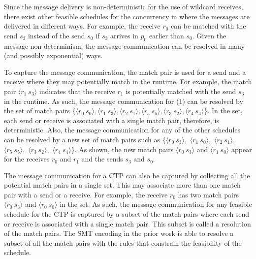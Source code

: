 Since the message delivery is non-deterministic for the use of wildcard receives, there exist other feasible schedules for the concurrency in  where the messages are delivered in different ways. For example,  the receive $r_0$ can be matched with the send $s_3$ instead of the send $s_0$ if $s_3$ arrives in $p_0$ earlier than $s_0$. Given the message non-determinism, the message communication can be resolved in many (and possibly exponential) ways. 

To capture the message communication, the match pair is used for a send and a receive where they may potentially match in the runtime.
For example, the match pair $\langle r_1\ s_3\rangle$ indicates that the receive $r_1$ is potentially matched with the send $s_3$ in the runtime.
As such, the message communication for (1) can be resolved by the set of match pairs $\{\langle r_0\ s_0\rangle, \langle r_1\ s_3\rangle, \langle r_2\ s_1\rangle, \langle r_5\ s_5\rangle, \langle r_3\ s_2\rangle, \langle r_4\ s_4\rangle\}$. In the set, each send or receive is associated with a single match pair, therefore, is deterministic. Also, the message communication for any of the other schedules can be resolved by a new set of match pairs such as $\{\langle r_0\ s_3\rangle,$ $\langle r_1\ s_0\rangle,$ $\langle r_2\ s_1\rangle,$ $\langle r_5\ s_5\rangle,$ $\langle r_3\ s_2\rangle,$ $\langle r_4\ s_4\rangle\}$. As shown, the new match pairs $\langle r_0\ s_3\rangle$ and $\langle r_1\ s_0\rangle$ appear for the receives $r_0$ and $r_1$ and the sends $s_3$ and $s_0$. 

The message communication for a CTP can also be captured by collecting all the potential match pairs in a single set. This may associate more than one match pair with a send or a receive. For example, the receive $r_0$ has two match pairs $\langle r_0\ s_3\rangle$ and $\langle r_0\ s_0\rangle$ in the set. As such, the message communication for any feasible schedule for the CTP is captured by a subset of the match pairs where each send or receive is associated with a single match pair. This subset is called a resolution of the match pairs.
The SMT encoding in the prior work is able to resolve a subset of all the match pairs with the rules that constrain the feasibility of the schedule. 








